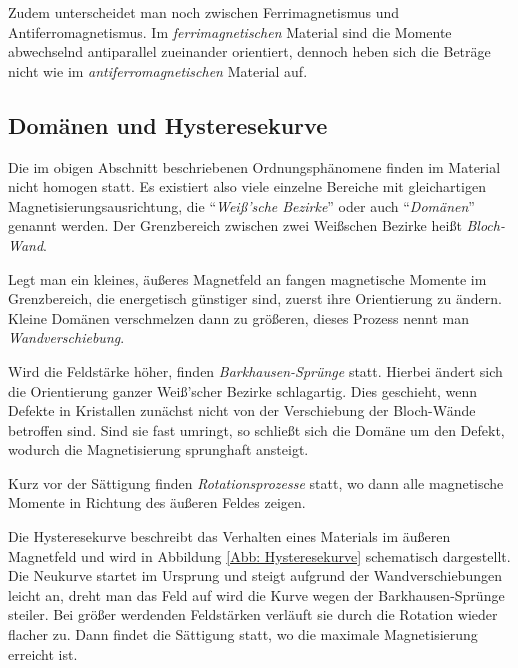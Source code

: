 \documentclass[12pt,a4paper]{scrartcl}
\numberwithin{equation}{section} %
\begin{document}
Zudem unterscheidet man noch zwischen Ferrimagnetismus und Antiferromagnetismus. Im \emph{ferrimagnetischen} Material sind die Momente abwechselnd antiparallel zueinander orientiert, dennoch heben sich die Beträge nicht wie im \emph{antiferromagnetischen} Material auf.

\hypertarget{domuxe4nen-und-hysteresekurve}{%
\subsection{Domänen und Hysteresekurve}\label{domuxe4nen-und-hysteresekurve}}
Die im obigen Abschnitt beschriebenen Ordnungsphänomene finden im Material nicht homogen statt. Es existiert also viele einzelne Bereiche mit gleichartigen Magnetisierungsausrichtung, die ``\emph{Weiß'sche Bezirke}'' oder auch ``\emph{Domänen}'' genannt werden. Der Grenzbereich zwischen zwei Weißschen Bezirke heißt \emph{Bloch-Wand}.

Legt man ein kleines, äußeres Magnetfeld an fangen magnetische Momente im Grenzbereich, die energetisch günstiger sind, zuerst ihre Orientierung zu ändern. Kleine Domänen verschmelzen dann zu größeren, dieses Prozess nennt man \emph{Wandverschiebung}.

Wird die Feldstärke höher, finden \emph{Barkhausen-Sprünge} statt. Hierbei ändert sich die Orientierung ganzer Weiß'scher Bezirke schlagartig. Dies geschieht, wenn Defekte in Kristallen zunächst nicht von der Verschiebung der Bloch-Wände betroffen sind. Sind sie fast umringt, so schließt sich die Domäne um den Defekt, wodurch die Magnetisierung sprunghaft ansteigt.

Kurz vor der Sättigung finden \emph{Rotationsprozesse} statt, wo dann alle magnetische Momente in Richtung des äußeren Feldes zeigen.

Die Hysteresekurve beschreibt das Verhalten eines Materials im äußeren Magnetfeld und wird in Abbildung \ref{Abb: Hysteresekurve} schematisch dargestellt. Die Neukurve startet im Ursprung und steigt aufgrund der Wandverschiebungen leicht an, dreht man das Feld auf wird die Kurve wegen der Barkhausen-Sprünge steiler. Bei größer werdenden Feldstärken verläuft sie durch die Rotation wieder flacher zu. Dann findet die Sättigung statt, wo die maximale Magnetisierung erreicht ist.
\end{document}
